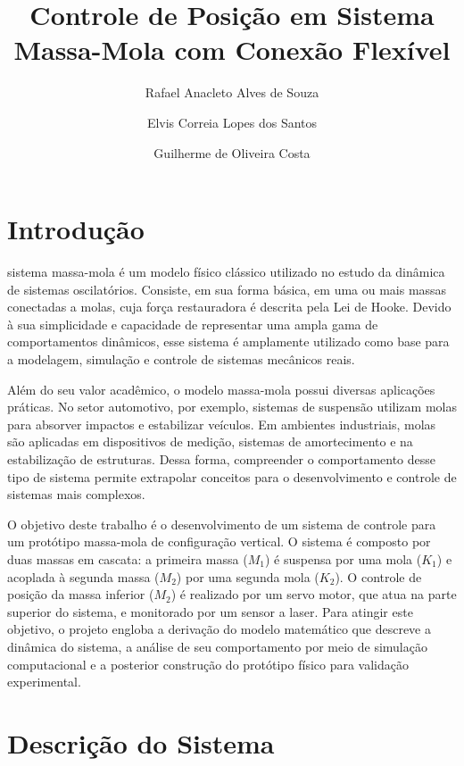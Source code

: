 \documentclass[9pt,a4paper,twocolumn,twoside]{tau-class/tau}
\title{Controle de Posição em Sistema Massa-Mola com Conexão Flexível}
\author[a,1]{Rafael Anacleto Alves de Souza}
\author[a,2]{Elvis Correia Lopes dos Santos}
\author[a,3]{Guilherme de Oliveira Costa}
\affil[a]{Instituto de Computação, Universidade Federal de Alagoas – Campus A.C. Simões\\
\textsuperscript{1}\texttt{raas@ic.ufal.br}, 
\textsuperscript{2}\texttt{ecls@ic.ufal.br}, 
\textsuperscript{3}\texttt{goc@ic.ufal.br}}
\begin{document}
		
    \maketitle 
    \thispagestyle{firststyle} 
    \tauabstract
    

\section{Introdução}

sistema massa-mola é um modelo físico clássico utilizado no estudo da dinâmica de sistemas oscilatórios. Consiste, em sua forma básica, em uma ou mais massas conectadas a molas, cuja força restauradora é descrita pela Lei de Hooke. Devido à sua simplicidade e capacidade de representar uma ampla gama de comportamentos dinâmicos, esse sistema é amplamente utilizado como base para a modelagem, simulação e controle de sistemas mecânicos reais.

Além do seu valor acadêmico, o modelo massa-mola possui diversas aplicações práticas. No setor automotivo, por exemplo, sistemas de suspensão utilizam molas para absorver impactos e estabilizar veículos. Em ambientes industriais, molas são aplicadas em dispositivos de medição, sistemas de amortecimento e na estabilização de estruturas. Dessa forma, compreender o comportamento desse tipo de sistema permite extrapolar conceitos para o desenvolvimento e controle de sistemas mais complexos.

O objetivo deste trabalho é o desenvolvimento de um sistema de controle para um protótipo massa-mola de configuração vertical. O sistema é composto por duas massas em cascata: a primeira massa ($M_1$) é suspensa por uma mola ($K_1$) e acoplada à segunda massa ($M_2$) por uma segunda mola ($K_2$). O controle de posição da massa inferior ($M_2$) é realizado por um servo motor, que atua na parte superior do sistema, e monitorado por um sensor a laser. Para atingir este objetivo, o projeto engloba a derivação do modelo matemático que descreve a dinâmica do sistema, a análise de seu comportamento por meio de simulação computacional e a posterior construção do protótipo físico para validação experimental.

\section{Descrição do Sistema}
\end{document}
